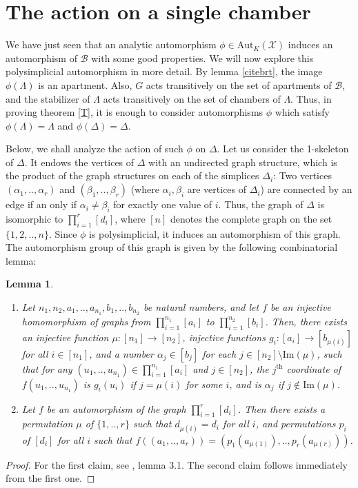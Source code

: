 \documentclass{amsart}
\theoremstyle{theorem}
\theoremstyle{lemma}
\newtheorem{lemma}{Lemma}[section]
\theoremstyle{prop}
\theoremstyle{definition}
\theoremstyle{corollary}
\theoremstyle{remark}
\newcommand{\B}{\mathcal{B}}
\newcommand{\X}{\mathcal{X}}
\newcommand{\Aut}{\text{Aut}}
\begin{document}

\section{The action on a single chamber}
\label{labelling}
We have just seen that an analytic automorphism $\phi\in \Aut_K(\X)$ induces an automorphism of $\B$ with some good properties. We will now explore this polysimplicial automorphism in more detail. By lemma \ref{citebrt}, the image $\phi(\Lambda)$ is an apartment. Also, $G$ acts transitively on the set of apartments of $\B$, and the stabilizer of $\Lambda$ acts transitively on the set of chambers of $\Lambda$. Thus, in proving theorem \ref{T}, it is enough to consider automorphisms $\phi$ which satisfy $\phi(\Lambda) = \Lambda$ and $\phi(\Delta)=\Delta$.

Below, we shall analyze the action of such $\phi$ on $\Delta$. Let us consider the 1-skeleton of $\Delta$. It endows the vertices of $\Delta$ with an undirected graph structure, which is the product of the graph structures on each of the simplices $\Delta_i$: Two vertices  $(\alpha_1,..,\alpha_r)$ and $(\beta_1,..,\beta_r)$ (where $\alpha_i, \beta_i$ are vertices of $\Delta_i$) are connected by an edge if an only if $\alpha_i \neq \beta_i$ for exactly one value of $i$. Thus, the graph of $\Delta$ is isomorphic to $\prod_{i=1}^r [d_i]$, where $[n]$ denotes the complete graph on the set $\{1,2,..,n\}$. Since $\phi$ is polysimplicial, it induces an automorphism of this graph. The automorphism group of this graph is given by the following combinatorial lemma:
\begin{lemma}\label{graphaut} 
\begin{enumerate} \item Let $n_1,n_2,a_1,..,a_{n_1},b_1,..,b_{n_2}$ be natural numbers, and let $f$ be an injective homomorphism of graphs from $\prod_{i=1}^{n_1}[a_i]$ to $\prod_{i=1}^{n_2}[b_i]$. Then, there exists an injective function $\mu: [n_1] \rightarrow [n_2]$, injective functions $g_i:[a_i]\rightarrow[b_{\mu(i)}]$ for all $i\in [n_1]$, and a number $\alpha_j\in [b_j]$ for each $j \in [n_2] \setminus \text{Im}(\mu)$, such that for any $(u_1,..,u_{n_1}) \in \prod_{i=1}^{n_1}[a_i]$ and $j\in [n_2]$, the $j^\text{th}$ coordinate of $f(u_1,..,u_{n_1})$ is $g_i(u_i)$ if $j=\mu(i)$ for some $i$, and is $\alpha_j$ if $j \notin \text{Im}(\mu)$.
\item
Let $f$ be an automorphism of the graph $\prod_{i=1}^r [d_i]$. Then there exists a permutation $\mu$ of $\{1,..,r\}$ such that $d_{\mu(i)}=d_i$ for all $i$, and permutations $p_i$ of $[d_i]$ for all $i$ such that $f((a_1,..,a_r))=(p_1(a_{\mu(1)}),..,p_r(a_{\mu(r)}))$.\end{enumerate}\end{lemma}
\begin{proof} For the first claim, see \cite{ber3}, lemma 3.1. The second claim follows immediately from the first one. \end{proof}
\end{document}
